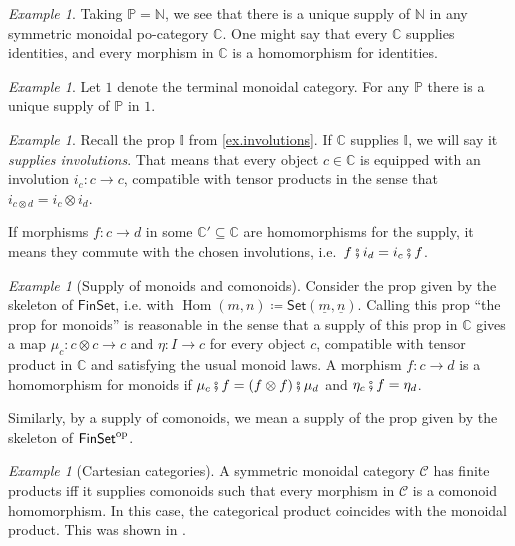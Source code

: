\documentclass[11pt, oneside, article]{memoir}
\theoremstyle{plain}
\theoremstyle{definition}
\theoremstyle{remark}
\newtheorem{example}[theorem]{Example}
\newcommand{\ord}[1]{\underline{#1}}%
\newcommand{\cat}[1]{\mathcal{#1}}%
\newcommand{\ccat}[1]{\mathbb{#1}}%
\newcommand{\Cat}[1]{{\mathsf{#1}}}%
\DeclareMathOperator{\Hom}{Hom}
\newcommand{\tn}[1]{\textnormal{#1}}
\newcommand{\op}{^{\tn{op}}}
\newcommand{\finset}{\Cat{FinSet}}
\newcommand{\smset}{\Cat{Set}}
\newcommand{\cc}{\mathbb{C}}
\newcommand{\nn}{\mathbb{N}}
\newcommand{\pp}{\mathbb{P}}
\newcommand{\cp}{\mathbin{\fatsemi}}
\renewcommand{\ss}{\subseteq}
\begin{document}
\begin{example}
Taking $\pp=\nn$, we see that there is a unique supply of $\nn$ in any symmetric monoidal po-category $\cc$. One might say that every $\cc$ supplies identities, and every morphism in $\cc$ is a homomorphism for identities.
\end{example}


\begin{example}\label{ex.terminal_supply}
Let $1$ denote the terminal monoidal category. For any $\pp$ there is a unique supply of $\pp$ in $1$.
\end{example}

\begin{example}\label{ex.supply_involutions}
Recall the prop $\ccat{I}$ from \cref{ex.involutions}. If $\cc$ supplies $\ccat{I}$, we will say it \emph{supplies involutions}. That means that every object $c\in\cc$ is equipped with an involution $i_c\colon c\to c$, compatible with tensor products in the sense that $i_{c\otimes d}=i_c\otimes i_d$.
 
If morphisms $f\colon c\to d$ in some $\cc'\ss\cc$ are homomorphisms for the supply, it means they commute with the chosen involutions, i.e.\ $f\cp i_d=i_c\cp f$.
\end{example}

\begin{example}[Supply of monoids and comonoids]
Consider the prop given by the skeleton of $\finset$, i.e. with $\Hom(m,n)\coloneqq\smset(\ord{m},\ord{n})$. Calling this prop ``the prop for monoids'' is reasonable in the sense that a supply of this prop in $\cc$ gives a map $\mu_c\colon c\otimes c\to c$ and $\eta\colon I\to c$ for every object $c$, compatible with tensor product in $\cc$ and satisfying the usual monoid laws. A morphism $f\colon c\to d$ is a homomorphism for monoids if $\mu_c\cp f=(f\otimes f)\cp \mu_d$ and $\eta_c\cp f=\eta_d$.

Similarly, by a supply of comonoids, we mean a supply of the prop given by the skeleton of $\finset\op$.
\end{example}

\begin{example}[Cartesian categories]\label{ex.cart_grant_comonoids}
A symmetric monoidal category $\cat{C}$ has finite products iff it supplies comonoids such that every morphism in $\cat{C}$ is a comonoid homomorphism. In this case, the categorical product coincides with the monoidal product. This was shown in \cite{fox1976coalgebras}.
\end{example}
\end{document}
